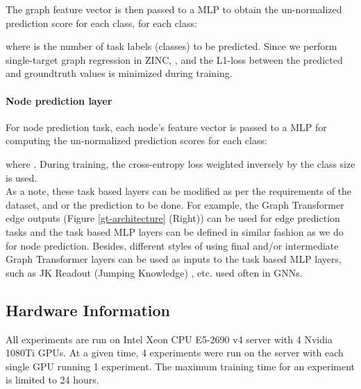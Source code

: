 \documentclass[letterpaper]{article} \usepackage{aaai21}  \usepackage{times}  \usepackage{helvet} \usepackage{courier}  \usepackage[hyphens]{url}  \usepackage{graphicx} \urlstyle{rm} \def\UrlFont{\rm}  \usepackage{natbib}  \usepackage{caption} \usepackage{xcolor}
\begin{document}
The graph feature vector is then passed to a MLP to obtain the un-normalized prediction score for each class,  for each class:

where  is the number of task labels (classes) to be predicted. 
Since we perform single-target graph regression in ZINC, , and the L1-loss between the predicted and groundtruth values is minimized during training.

\paragraph{Node prediction layer}
For node prediction task, each node's feature vector is passed to a MLP for computing the un-normalized prediction scores  for each class:

where . During training, the cross-entropy loss weighted inversely by the class size is used.\\

As a note, these task based layers can be modified as per the requirements of the dataset, and or the prediction to be done. For example, the Graph Transformer edge outputs (Figure \ref{gt-architecture} (Right)) can be used for edge prediction tasks and the task based MLP layers can be defined in similar fashion as we do for node prediction. Besides, different styles of using final and/or intermediate Graph Transformer layers can be used as inputs to the task based MLP layers, such as JK Readout (Jumping Knowledge) \cite{xu2018representation}, etc. used often in GNNs.


\subsection{Hardware Information}
All experiments are run on Intel Xeon CPU E5-2690 v4 server with 4 Nvidia 1080Ti GPUs. At a given time, 4 experiments were run on the server with each single GPU running 1 experiment.
The maximum training time for an experiment is limited to 24 hours.
\end{document}

